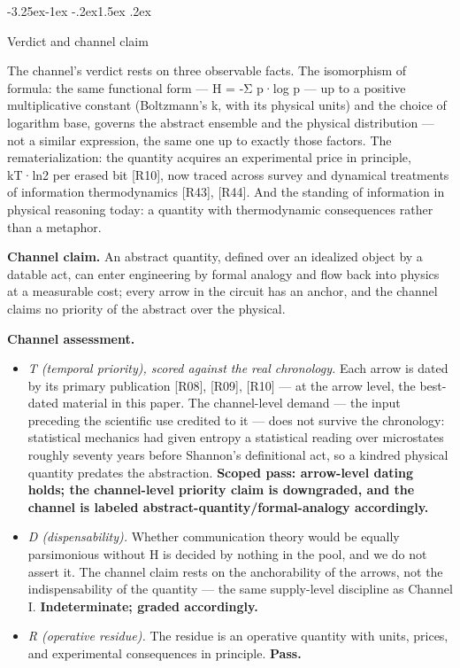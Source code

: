 \documentclass[11pt,a4paper]{article}
\makeatletter
\renewcommand\subsection{\@startsection{subsection}{2}{\z@}%
  {-3.25ex\@plus -1ex \@minus -.2ex}{1.5ex \@plus .2ex}%
  {\normalfont\large\bfseries\raggedright}}
\makeatother
\begin{document}
\subsection{Verdict and channel claim}

The channel's verdict rests on three observable facts. The isomorphism of formula: the same functional form — H = -Σ p·log p — up to a positive multiplicative constant (Boltzmann's k, with its physical units) and the choice of logarithm base, governs the abstract ensemble and the physical distribution — not a similar expression, the same one up to exactly those factors. The rematerialization: the quantity acquires an experimental price in principle, kT·ln2 per erased bit [R10], now traced across survey and dynamical treatments of information thermodynamics [R43], [R44]. And the standing of information in physical reasoning today: a quantity with thermodynamic consequences rather than a metaphor.

\textbf{Channel claim.} An abstract quantity, defined over an idealized object by a datable act, can enter engineering by formal analogy and flow back into physics at a measurable cost; every arrow in the circuit has an anchor, and the channel claims no priority of the abstract over the physical.

\textbf{Channel assessment.}

\begin{itemize}[leftmargin=1.6em,itemsep=2pt,parsep=0pt,topsep=3pt]
\item \textit{T (temporal priority), scored against the real chronology.} Each arrow is dated by its primary publication [R08], [R09], [R10] — at the arrow level, the best-dated material in this paper. The channel-level demand — the input preceding the scientific use credited to it — does not survive the chronology: statistical mechanics had given entropy a statistical reading over microstates roughly seventy years before Shannon's definitional act, so a kindred physical quantity predates the abstraction. \textbf{Scoped pass: arrow-level dating holds; the channel-level priority claim is downgraded, and the channel is labeled abstract-quantity/formal-analogy accordingly.}
\item \textit{D (dispensability).} Whether communication theory would be equally parsimonious without H is decided by nothing in the pool, and we do not assert it. The channel claim rests on the anchorability of the arrows, not the indispensability of the quantity — the same supply-level discipline as Channel I. \textbf{Indeterminate; graded accordingly.}
\item \textit{R (operative residue).} The residue is an operative quantity with units, prices, and experimental consequences in principle. \textbf{Pass.}
\end{itemize}
\end{document}
